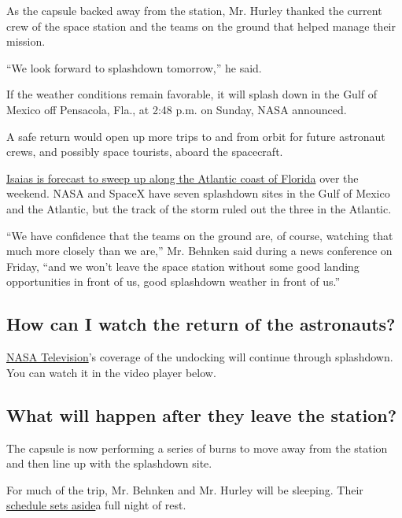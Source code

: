 As the capsule backed away from the station, Mr. Hurley thanked the
current crew of the space station and the teams on the ground that
helped manage their mission.

``We look forward to splashdown tomorrow,'' he said.

If the weather conditions remain favorable, it will splash down in the
Gulf of Mexico off Pensacola, Fla., at 2:48 p.m. on Sunday, NASA
announced.

A safe return would open up more trips to and from orbit for future
astronaut crews, and possibly space tourists, aboard the spacecraft.

\href{https://www.nytimes3xbfgragh.onion/2020/08/01/us/hurricane-isaias-track.html}{Isaias
is forecast to sweep up along the Atlantic coast of Florida} over the
weekend. NASA and SpaceX have seven splashdown sites in the Gulf of
Mexico and the Atlantic, but the track of the storm ruled out the three
in the Atlantic.

``We have confidence that the teams on the ground are, of course,
watching that much more closely than we are,'' Mr. Behnken said during a
news conference on Friday, ``and we won't leave the space station
without some good landing opportunities in front of us, good splashdown
weather in front of us.''

\hypertarget{how-can-i-watch-the-return-of-the-astronauts}{%
\subsection{How can I watch the return of the
astronauts?}\label{how-can-i-watch-the-return-of-the-astronauts}}

\href{https://www.nasa.gov/multimedia/nasatv/\#public}{NASA
Television}'s coverage of the undocking will continue through
splashdown. You can watch it in the video player below.

\hypertarget{what-will-happen-after-they-leave-the-station}{%
\subsection{What will happen after they leave the
station?}\label{what-will-happen-after-they-leave-the-station}}

The capsule is now performing a series of burns to move away from the
station and then line up with the splashdown site.

For much of the trip, Mr. Behnken and Mr. Hurley will be sleeping. Their
\href{https://twitter.com/NASA/status/1289245570565992449}{schedule sets
aside}a full night of rest.

